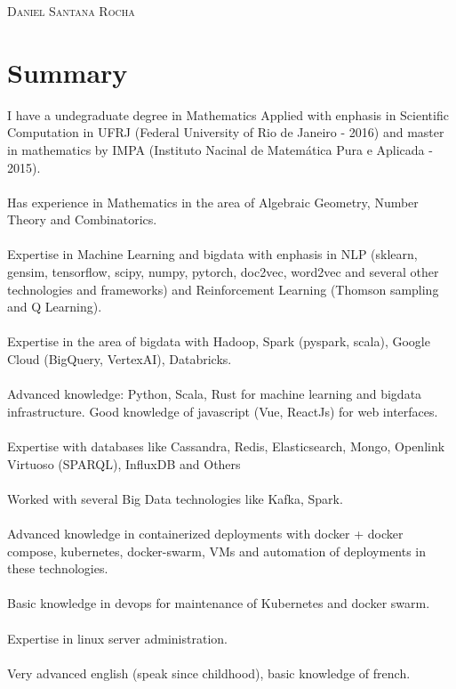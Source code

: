 \documentclass[a4paper, oneside, final]{report} %
\begin{document}
\begin{center} 
{\fontsize{36}{36}\selectfont\scshape Daniel Santana Rocha} %

\vspace{1.5cm} 

\end{center}
\section{Summary}

I have a undegraduate degree in Mathematics Applied with enphasis in Scientific Computation in UFRJ (Federal University of Rio de Janeiro - 2016) and master in mathematics by IMPA (Instituto Nacinal de Matemática Pura e Aplicada - 2015).
\\ \\
Has experience in Mathematics in the area of Algebraic Geometry, Number Theory and Combinatorics.
\\ \\
Expertise in Machine Learning and bigdata with enphasis in NLP (sklearn, gensim, tensorflow, scipy, numpy, pytorch, doc2vec, word2vec and several other technologies and frameworks) and Reinforcement Learning (Thomson sampling and Q Learning).
\\ \\
Expertise in the area of bigdata with Hadoop, Spark (pyspark, scala), Google Cloud (BigQuery, VertexAI), Databricks.
\\ \\
Advanced knowledge: Python, Scala, Rust for machine learning and bigdata infrastructure. Good knowledge of javascript (Vue, ReactJs) for web interfaces.
\\ \\
Expertise with databases like Cassandra, Redis, Elasticsearch, Mongo, Openlink Virtuoso (SPARQL), InfluxDB and Others
\\ \\
Worked with several Big Data technologies like Kafka, Spark.
\\ \\
Advanced knowledge in containerized deployments with docker + docker compose, kubernetes, docker-swarm, VMs and automation of deployments in these technologies.
\\ \\
Basic knowledge in devops for maintenance of Kubernetes and docker swarm.
\\ \\
Expertise in linux server administration.
\\ \\
Very advanced english (speak since childhood), basic knowledge of french.
\end{document}
